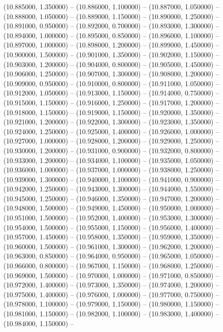 (10.885000, 1.350000) -- 
(10.886000, 1.100000) -- 
(10.887000, 1.050000) -- 
(10.888000, 1.050000) -- 
(10.889000, 1.150000) -- 
(10.890000, 1.250000) -- 
(10.891000, 0.950000) -- 
(10.892000, 0.700000) -- 
(10.893000, 1.300000) -- 
(10.894000, 1.000000) -- 
(10.895000, 0.850000) -- 
(10.896000, 1.100000) -- 
(10.897000, 1.000000) -- 
(10.898000, 1.200000) -- 
(10.899000, 1.450000) -- 
(10.900000, 1.500000) -- 
(10.901000, 1.350000) -- 
(10.902000, 1.150000) -- 
(10.903000, 1.200000) -- 
(10.904000, 0.800000) -- 
(10.905000, 1.450000) -- 
(10.906000, 1.250000) -- 
(10.907000, 1.300000) -- 
(10.908000, 1.200000) -- 
(10.909000, 0.950000) -- 
(10.910000, 0.800000) -- 
(10.911000, 1.050000) -- 
(10.912000, 1.050000) -- 
(10.913000, 1.150000) -- 
(10.914000, 0.750000) -- 
(10.915000, 1.150000) -- 
(10.916000, 1.250000) -- 
(10.917000, 1.200000) -- 
(10.918000, 1.150000) -- 
(10.919000, 1.150000) -- 
(10.920000, 1.350000) -- 
(10.921000, 1.200000) -- 
(10.922000, 1.300000) -- 
(10.923000, 1.350000) -- 
(10.924000, 1.250000) -- 
(10.925000, 1.400000) -- 
(10.926000, 1.000000) -- 
(10.927000, 1.000000) -- 
(10.928000, 1.200000) -- 
(10.929000, 1.250000) -- 
(10.930000, 1.200000) -- 
(10.931000, 0.900000) -- 
(10.932000, 0.800000) -- 
(10.933000, 1.200000) -- 
(10.934000, 1.100000) -- 
(10.935000, 1.050000) -- 
(10.936000, 1.000000) -- 
(10.937000, 1.000000) -- 
(10.938000, 1.250000) -- 
(10.939000, 1.300000) -- 
(10.940000, 1.100000) -- 
(10.941000, 0.900000) -- 
(10.942000, 1.250000) -- 
(10.943000, 1.300000) -- 
(10.944000, 1.550000) -- 
(10.945000, 1.250000) -- 
(10.946000, 1.350000) -- 
(10.947000, 1.200000) -- 
(10.948000, 1.500000) -- 
(10.949000, 1.450000) -- 
(10.950000, 1.000000) -- 
(10.951000, 1.500000) -- 
(10.952000, 1.400000) -- 
(10.953000, 1.300000) -- 
(10.954000, 1.500000) -- 
(10.955000, 1.150000) -- 
(10.956000, 1.400000) -- 
(10.957000, 1.450000) -- 
(10.958000, 1.350000) -- 
(10.959000, 1.350000) -- 
(10.960000, 1.500000) -- 
(10.961000, 1.300000) -- 
(10.962000, 1.200000) -- 
(10.963000, 0.850000) -- 
(10.964000, 0.950000) -- 
(10.965000, 1.050000) -- 
(10.966000, 0.800000) -- 
(10.967000, 1.150000) -- 
(10.968000, 1.250000) -- 
(10.969000, 1.500000) -- 
(10.970000, 1.000000) -- 
(10.971000, 0.850000) -- 
(10.972000, 1.400000) -- 
(10.973000, 1.350000) -- 
(10.974000, 1.200000) -- 
(10.975000, 1.400000) -- 
(10.976000, 1.000000) -- 
(10.977000, 0.750000) -- 
(10.978000, 1.100000) -- 
(10.979000, 1.150000) -- 
(10.980000, 1.150000) -- 
(10.981000, 1.150000) -- 
(10.982000, 1.100000) -- 
(10.983000, 1.400000) -- 
(10.984000, 1.150000) -- 
